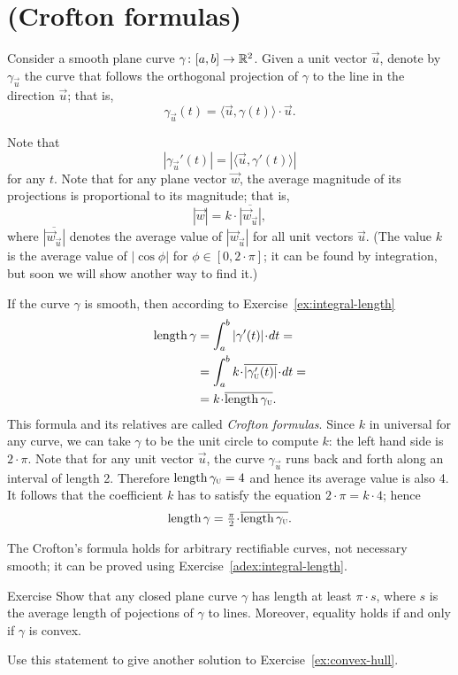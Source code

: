 \section{(Crofton formulas)}\label{page:crofton}

Consider a smooth plane curve $\gamma\colon[a,b]\to\mathbb{R}^2$.
Given a unit vector ${\vec u}$, denote by $\gamma_{\vec u}$ the curve that follows the orthogonal projection of $\gamma$ to the line in the direction ${\vec u}$;
that is, 
\[\gamma_{\vec u}(t)=\langle {\vec u},\gamma(t)\rangle\cdot {\vec u}.\]

Note that 
\[|\gamma_{\vec u}'(t)|=|\langle {\vec u},\gamma'(t)\rangle|\] for any $t$.
Note that for any plane vector ${\vec w}$, the average magnitude of its projections is proportional to its magnitude; that is,
\[|{\vec w}|=k\cdot \overline{|{\vec w}_{\vec u}|},\]
where $\overline{|{\vec w}_{\vec u}|}$ denotes the average value of $|{\vec w}_{\vec u}|$ for all unit vectors ${\vec u}$.
(The value $k$ is the average value of $|\cos\phi|$ for $\phi\in [0,2\cdot\pi]$; it can be found by integration, but soon we will show another way to find it.)

If the curve $\gamma$ is smooth, then according to Exercise~\ref{ex:integral-length}
\begin{align*}
\length\gamma
&=\int_a^b|\gamma'(t)|\cdot dt=
\\
&=\int_a^b  k\cdot \overline{|\gamma_{\vec u}'(t)|}\cdot dt=
\\
&=k\cdot \overline{\length\gamma_{\vec u}}.
\end{align*}
This formula and its relatives are called \emph{Crofton formulas}.
Since $k$ in universal for any curve, we can take $\gamma$ to be the unit circle to compute $k$: the left hand side is $2\cdot\pi$.
Note that for any unit vector ${\vec u}$, the curve $\gamma_{\vec u}$ runs back and forth along an interval of length 2.
Therefore $\mathop{\rm length}\nolimits\gamma_{\textsc u}=4$ and hence its average value is also 4.
It follows that the coefficient $k$ has to satisfy the equation $2\cdot \pi =k\cdot 4$; hence 
\[
\length\gamma
=\tfrac\pi2\cdot \overline{\length\gamma_{\vec u}}.
\]

The Crofton's formula holds for arbitrary rectifiable curves, not necessary smooth; it can be proved using Exercise~\ref{adex:integral-length}.

\begin{thm}{Exercise}\label{ex:convex-croftons}
Show that any closed plane curve $\gamma$ has length at least $\pi\cdot s$, where $s$ is the average length of pojections of $\gamma$ to lines.
Moreover, equality holds if and only if $\gamma$ is convex.

Use this statement to give another solution to Exercise~\ref{ex:convex-hull}.
\end{thm}

